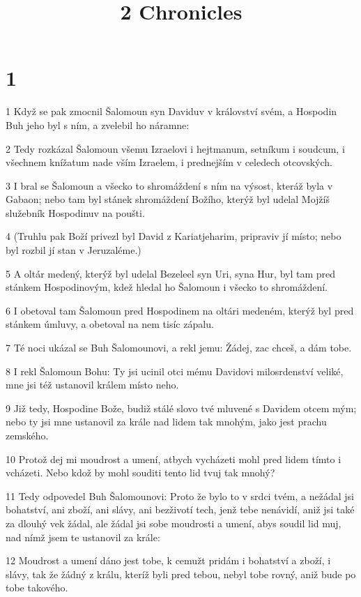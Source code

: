 

\title{2 Chronicles}

\chapter{1}

\par 1 Když se pak zmocnil Šalomoun syn Daviduv v království svém, a Hospodin Buh jeho byl s ním, a zvelebil ho náramne:
\par 2 Tedy rozkázal Šalomoun všemu Izraelovi i hejtmanum, setníkum i soudcum, i všechnem knížatum nade vším Izraelem, i prednejším v celedech otcovských.
\par 3 I bral se Šalomoun a všecko to shromáždení s ním na výsost, kteráž byla v Gabaon; nebo tam byl stánek shromáždení Božího, kterýž byl udelal Mojžíš služebník Hospodinuv na poušti.
\par 4 (Truhlu pak Boží privezl byl David z Kariatjeharim, pripraviv jí místo; nebo byl rozbil jí stan v Jeruzaléme.)
\par 5 A oltár medený, kterýž byl udelal Bezeleel syn Uri, syna Hur, byl tam pred stánkem Hospodinovým, kdež hledal ho Šalomoun i všecko to shromáždení.
\par 6 I obetoval tam Šalomoun pred Hospodinem na oltári medeném, kterýž byl pred stánkem úmluvy, a obetoval na nem tisíc zápalu.
\par 7 Té noci ukázal se Buh Šalomounovi, a rekl jemu: Žádej, zac chceš, a dám tobe.
\par 8 I rekl Šalomoun Bohu: Ty jsi ucinil otci mému Davidovi milosrdenství veliké, mne jsi též ustanovil králem místo neho.
\par 9 Již tedy, Hospodine Bože, budiž stálé slovo tvé mluvené s Davidem otcem mým; nebo ty jsi mne ustanovil za krále nad lidem tak mnohým, jako jest prachu zemského.
\par 10 Protož dej mi moudrost a umení, atbych vycházeti mohl pred lidem tímto i vcházeti. Nebo kdož by mohl souditi tento lid tvuj tak mnohý?
\par 11 Tedy odpovedel Buh Šalomounovi: Proto že bylo to v srdci tvém, a nežádal jsi bohatství, ani zboží, ani slávy, ani bezživotí tech, jenž tebe nenávidí, aniž jsi také za dlouhý vek žádal, ale žádal jsi sobe moudrosti a umení, abys soudil lid muj, nad nímž jsem te ustanovil za krále:
\par 12 Moudrost a umení dáno jest tobe, k cemužt pridám i bohatství a zboží, i slávy, tak že žádný z králu, kteríž byli pred tebou, nebyl tobe rovný, aniž bude po tobe takového.
